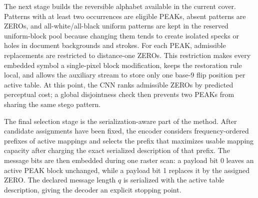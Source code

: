 \documentclass[a4paper,fleqn]{cas-dc}
\begin{document}
The next stage builds the reversible alphabet available in the current cover.
Patterns with at least two occurrences are eligible PEAKs, absent patterns are
ZEROs, and all-white/all-black uniform patterns are kept in the reserved
uniform-block pool because changing them tends to create isolated specks or holes in
document backgrounds and strokes. For each PEAK, admissible replacements are
restricted to distance-one ZEROs. This restriction makes every embedded symbol a
single-pixel block modification, keeps the restoration rule local, and allows
the auxiliary stream to store only one base-9 flip position per active table.
At this point, the CNN ranks admissible ZEROs by predicted perceptual cost;
a global disjointness check then prevents two PEAKs from sharing the same
stego pattern.

The final selection stage is the serialization-aware part of the method. After
candidate assignments have been fixed, the encoder considers frequency-ordered
prefixes of active mappings and selects the prefix that maximizes usable mapping capacity
after charging the exact serialized description of that prefix. The message bits
are then embedded during one raster scan: a payload bit 0 leaves an active PEAK
block unchanged, while a payload bit 1 replaces it by the assigned ZERO. The
declared message length $q$ is serialized with the active table description,
giving the decoder an explicit stopping point.
\end{document}
